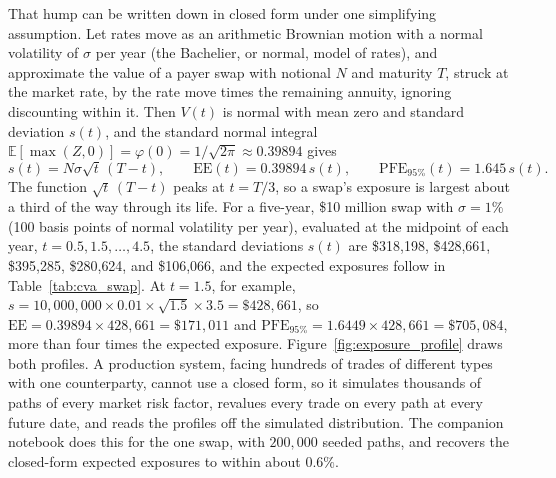 \documentclass[../ai_in_finance]{subfiles}
\begin{document}
That hump can be written down in closed form under one simplifying assumption. Let rates move as an arithmetic Brownian motion with a normal volatility of $\sigma$ per year (the Bachelier, or normal, model of rates), and approximate the value of a payer swap with notional $N$ and maturity $T$, struck at the market rate, by the rate move times the remaining annuity, ignoring discounting within it. Then $V(t)$ is normal with mean zero and standard deviation $s(t)$, and the standard normal integral $\mathbb{E}[\max(Z,0)] = \varphi(0) = 1/\sqrt{2\pi} \approx 0.39894$ gives
\begin{equation}
\label{eq:creditrisk-swap-ee}
s(t) = N \sigma \sqrt{t}\,(T-t), \qquad \text{EE}(t) = 0.39894\, s(t), \qquad \text{PFE}_{95\%}(t) = 1.645\, s(t).
\end{equation}
The function $\sqrt{t}\,(T-t)$ peaks at $t = T/3$, so a swap's exposure is largest about a third of the way through its life. For a five-year, \$10 million swap with $\sigma = 1\%$ (100 basis points of normal volatility per year), evaluated at the midpoint of each year, $t = 0.5, 1.5, \ldots, 4.5$, the standard deviations $s(t)$ are \$318{,}198, \$428{,}661, \$395{,}285, \$280{,}624, and \$106{,}066, and the expected exposures follow in Table~\ref{tab:cva_swap}. At $t=1.5$, for example, $s = 10{,}000{,}000 \times 0.01 \times \sqrt{1.5} \times 3.5 = \$428{,}661$, so $\text{EE} = 0.39894 \times 428{,}661 = \$171{,}011$ and $\text{PFE}_{95\%} = 1.6449 \times 428{,}661 = \$705{,}084$, more than four times the expected exposure. Figure~\ref{fig:exposure_profile} draws both profiles. A production system, facing hundreds of trades of different types with one counterparty, cannot use a closed form, so it simulates thousands of paths of every market risk factor, revalues every trade on every path at every future date, and reads the profiles off the simulated distribution. The companion notebook does this for the one swap, with $200{,}000$ seeded paths, and recovers the closed-form expected exposures to within about $0.6\%$.
\end{document}
